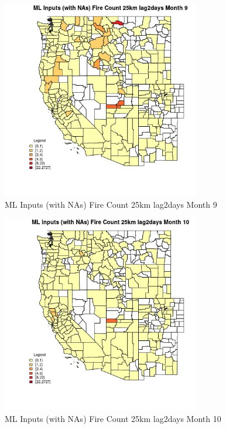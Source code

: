 \begin{figure} 
\centering  
\includegraphics[width=0.77\textwidth]{Code_Outputs/Report_ML_input_PM25_Step4_part_f_de_duplicated_aves_prioritize_24hr_obswNAs_CountyFire_Count_25km_lag2daysmedianMonth9.jpg} 
\caption{\label{fig:Report_ML_input_PM25_Step4_part_f_de_duplicated_aves_prioritize_24hr_obswNAsCountyFire_Count_25km_lag2daysmedianMonth9}ML Inputs (with NAs) Fire Count 25km lag2days Month 9} 
\end{figure} 
 

\begin{figure} 
\centering  
\includegraphics[width=0.77\textwidth]{Code_Outputs/Report_ML_input_PM25_Step4_part_f_de_duplicated_aves_prioritize_24hr_obswNAs_CountyFire_Count_25km_lag2daysmedianMonth10.jpg} 
\caption{\label{fig:Report_ML_input_PM25_Step4_part_f_de_duplicated_aves_prioritize_24hr_obswNAsCountyFire_Count_25km_lag2daysmedianMonth10}ML Inputs (with NAs) Fire Count 25km lag2days Month 10} 
\end{figure} 
 

